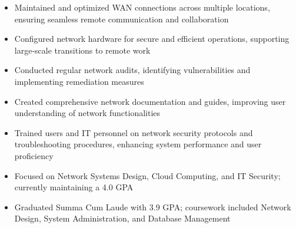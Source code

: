 \par\smallskip
\noindent
\begin{minipage}{20cm}
  \begin{minipage}{9.75cm}
    \begin{itemize}
      \item Maintained and optimized WAN connections across multiple locations, ensuring seamless remote communication and collaboration
      \item Configured network hardware for secure and efficient operations, supporting large-scale transitions to remote work
      \item Conducted regular network audits, identifying vulnerabilities and implementing remediation measures
    \end{itemize}
  \end{minipage}
  \hfill
  \begin{minipage}{9.75cm}
    \begin{itemize}
      \item Created comprehensive network documentation and guides, improving user understanding of network functionalities
      \item Trained users and IT personnel on network security protocols and troubleshooting procedures, enhancing system performance and user proficiency
    \end{itemize}
  \end{minipage}
\end{minipage}

\begin{itemize}
  \item Focused on Network Systems Design, Cloud Computing, and IT Security; currently maintaining a 4.0 GPA
\end{itemize}
\divider

\begin{itemize}
  \item Graduated Summa Cum Laude with 3.9 GPA; coursework included Network Design, System Administration, and Database Management
\end{itemize}

\noindent
\begin{minipage}{20cm}
      
     
      
     
\end{minipage}


